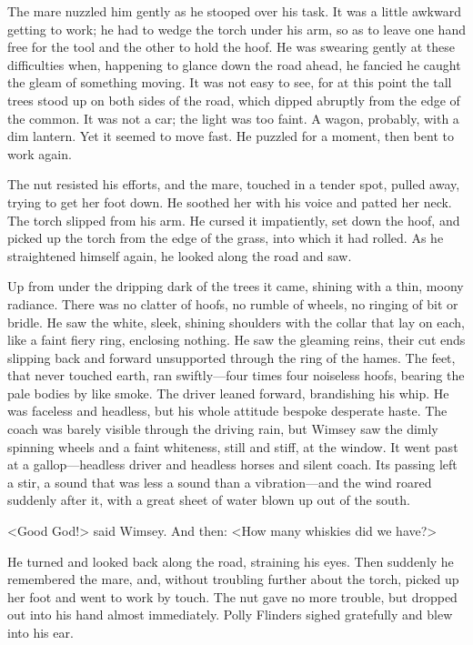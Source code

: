 The mare nuzzled him gently as he stooped over his task. It was a little awkward getting to work; he had to wedge the torch under his arm, so as to leave one hand free for the tool and the other to hold the hoof. He was swearing gently at these difficulties when, happening to glance down the road ahead, he fancied he caught the gleam of something moving. It was not easy to see, for at this point the tall trees stood up on both sides of the road, which dipped abruptly from the edge of the common. It was not a car; the light was too faint. A wagon, probably, with a dim lantern. Yet it seemed to move fast. He puzzled for a moment, then bent to work again.

The nut resisted his efforts, and the mare, touched in a tender spot, pulled away, trying to get her foot down. He soothed her with his voice and patted her neck. The torch slipped from his arm. He cursed it impatiently, set down the hoof, and picked up the torch from the edge of the grass, into which it had rolled. As he straightened himself again, he looked along the road and saw.

Up from under the dripping dark of the trees it came, shining with a thin, moony radiance. There was no clatter of hoofs, no rumble of wheels, no ringing of bit or bridle. He saw the white, sleek, shining shoulders with the collar that lay on each, like a faint fiery ring, enclosing nothing. He saw the gleaming reins, their cut ends slipping back and forward unsupported through the ring of the hames. The feet, that never touched earth, ran swiftly—four times four noiseless hoofs, bearing the pale bodies by like smoke. The driver leaned forward, brandishing his whip. He was faceless and headless, but his whole attitude bespoke desperate haste. The coach was barely visible through the driving rain, but Wimsey saw the dimly spinning wheels and a faint whiteness, still and stiff, at the window. It went past at a gallop—headless driver and headless horses and silent coach. Its passing left a stir, a sound that was less a sound than a vibration—and the wind roared suddenly after it, with a great sheet of water blown up out of the south.

<Good God!> said Wimsey. And then: <How many whiskies did we have?>

He turned and looked back along the road, straining his eyes. Then suddenly he remembered the mare, and, without troubling further about the torch, picked up her foot and went to work by touch. The nut gave no more trouble, but dropped out into his hand almost immediately. Polly Flinders sighed gratefully and blew into his ear.

